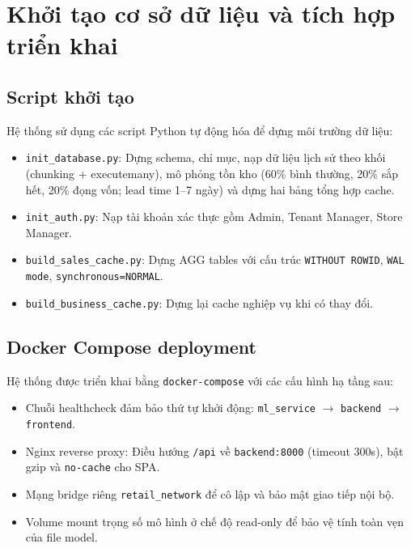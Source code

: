 \documentclass[12pt,a4paper]{report}
\begin{document}
\section{Khởi tạo cơ sở dữ liệu và tích hợp triển khai}

\subsection{Script khởi tạo}
Hệ thống sử dụng các script Python tự động hóa để dựng môi trường dữ liệu:
\begin{itemize}
    \item \texttt{init\_database.py}: Dựng schema, chỉ mục, nạp dữ liệu lịch sử theo khối (chunking + executemany), mô phỏng tồn kho (60\% bình thường, 20\% sắp hết, 20\% đọng vốn; lead time 1–7 ngày) và dựng hai bảng tổng hợp cache.
    \item \texttt{init\_auth.py}: Nạp tài khoản xác thực gồm Admin, Tenant Manager, Store Manager.
    \item \texttt{build\_sales\_cache.py}: Dựng AGG tables với cấu trúc \texttt{WITHOUT ROWID}, \texttt{WAL mode}, \texttt{synchronous=NORMAL}.
    \item \texttt{build\_business\_cache.py}: Dựng lại cache nghiệp vụ khi có thay đổi.
\end{itemize}

\subsection{Docker Compose deployment}
Hệ thống được triển khai bằng \texttt{docker-compose} với các cấu hình hạ tầng sau:
\begin{itemize}
    \item Chuỗi healthcheck đảm bảo thứ tự khởi động: \texttt{ml\_service} $\rightarrow$ \texttt{backend} $\rightarrow$ \texttt{frontend}.
    \item Nginx reverse proxy: Điều hướng \texttt{/api} về \texttt{backend:8000} (timeout 300s), bật gzip và \texttt{no-cache} cho SPA.
    \item Mạng bridge riêng \texttt{retail\_network} để cô lập và bảo mật giao tiếp nội bộ.
    \item Volume mount trọng số mô hình ở chế độ read-only để bảo vệ tính toàn vẹn của file model.
\end{itemize}
\end{document}
